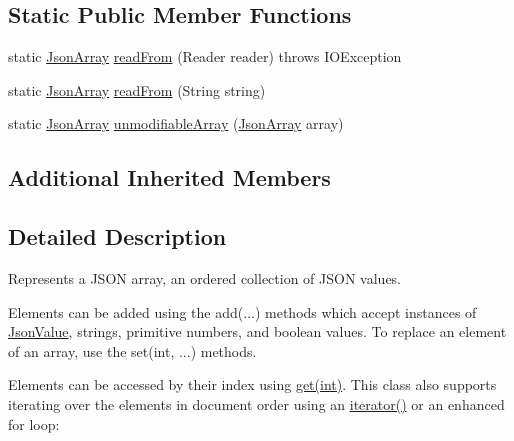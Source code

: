 \subsection*{Static Public Member Functions}
\begin{DoxyCompactItemize}
\item 
static \hyperlink{classcom_1_1ingeniigroup_1_1stratux_1_1_tools_1_1_json_micro_1_1_json_array}{Json\+Array} \hyperlink{classcom_1_1ingeniigroup_1_1stratux_1_1_tools_1_1_json_micro_1_1_json_array_a152b53f97c4f43821c69f1a917b7c6db}{read\+From} (Reader reader)  throws I\+O\+Exception 
\item 
static \hyperlink{classcom_1_1ingeniigroup_1_1stratux_1_1_tools_1_1_json_micro_1_1_json_array}{Json\+Array} \hyperlink{classcom_1_1ingeniigroup_1_1stratux_1_1_tools_1_1_json_micro_1_1_json_array_a7fd156d1dc6294a35e191503db03d755}{read\+From} (String string)
\item 
static \hyperlink{classcom_1_1ingeniigroup_1_1stratux_1_1_tools_1_1_json_micro_1_1_json_array}{Json\+Array} \hyperlink{classcom_1_1ingeniigroup_1_1stratux_1_1_tools_1_1_json_micro_1_1_json_array_ad73f1a3bfaa7cf1e89fb6f50be08ff54}{unmodifiable\+Array} (\hyperlink{classcom_1_1ingeniigroup_1_1stratux_1_1_tools_1_1_json_micro_1_1_json_array}{Json\+Array} array)
\end{DoxyCompactItemize}
\subsection*{Additional Inherited Members}


\subsection{Detailed Description}
Represents a J\+S\+ON array, an ordered collection of J\+S\+ON values. 

Elements can be added using the {\ttfamily add(...)} methods which accept instances of \hyperlink{classcom_1_1ingeniigroup_1_1stratux_1_1_tools_1_1_json_micro_1_1_json_value}{Json\+Value}, strings, primitive numbers, and boolean values. To replace an element of an array, use the {\ttfamily set(int, ...)} methods. 

Elements can be accessed by their index using \hyperlink{classcom_1_1ingeniigroup_1_1stratux_1_1_tools_1_1_json_micro_1_1_json_array_a3cef2428f522259f9fbd827fd60a17ea}{get(int)}. This class also supports iterating over the elements in document order using an \hyperlink{classcom_1_1ingeniigroup_1_1stratux_1_1_tools_1_1_json_micro_1_1_json_array_a424e080bf99ab9ad9bdc469974874fa8}{iterator()} or an enhanced for loop\+: 


